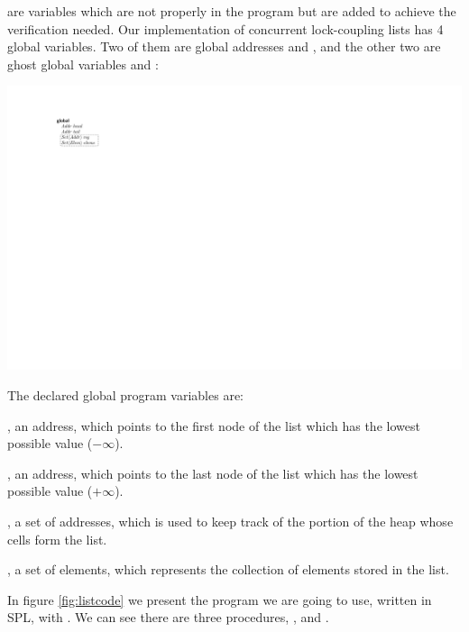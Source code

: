  are variables which are not properly in the program but are added to 
achieve the verification needed.
Our implementation of concurrent lock-coupling lists has 4 global variables.
%
Two of them are global addresses \head and \tail, and the other two are ghost global variables \region and \elements:
%
\begin{center}
	\includegraphics[scale=\figscale]{graphics/_lists_classes}
\end{center}
%
The declared global program variables are:

\head, an address, which points to the first node of the list which has the lowest possible value ($-\infty$).

\tail, an address, which points to the last node of the list  which has the lowest possible value ($+\infty$).

\region, a set of addresses, which is used to keep track of the portion of the heap whose cells form the list.

\elements, a set of elements, which represents the collection of elements stored in the list.

In figure \ref{fig:listcode} we present the program we are going to use, written in \gls{SPL}, with . We can see there are three procedures, \Search, \Insert and \Remove. 

